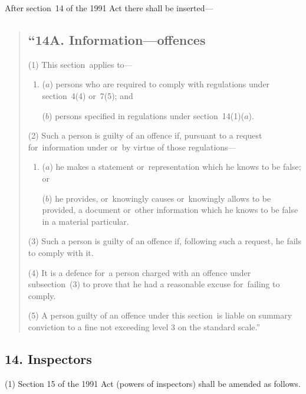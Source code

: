 \documentclass[12pt,a4paper]{article}
\begin{document}
After section~14 of the 1991 Act there shall be inserted—
\begin{quotation}
\subsection*{“14A. Information—offences}

(1) This section~applies to—
\begin{enumerate}\item[]
($a$) persons who are required to comply with regulations under section~4(4)  or~7(5); and

($b$) persons specified in regulations under section~14(1)($a$).
\end{enumerate}

(2) Such a person is guilty of an offence if, pursuant to a request for~information under or~by virtue of those regulations—
\begin{enumerate}\item[]
($a$) he makes a statement or~representation which he knows to be false; or

($b$) he provides, or~knowingly causes or~knowingly allows to be provided, a document or~other information which he knows to be false in a material particular.
\end{enumerate}

(3) Such a person is guilty of an offence if, following such a request, he fails to comply with it.

(4) It is a defence for~a person charged with an offence under subsection~(3)  to prove that he had a reasonable excuse for~failing to comply.

(5) A person guilty of an offence under this section~is liable on summary conviction to a fine not exceeding level 3 on the standard scale.”
\end{quotation}

\subsection{14. Inspectors}

(1) Section 15 of the 1991 Act (powers of inspectors) shall be amended as follows.
\end{document}
